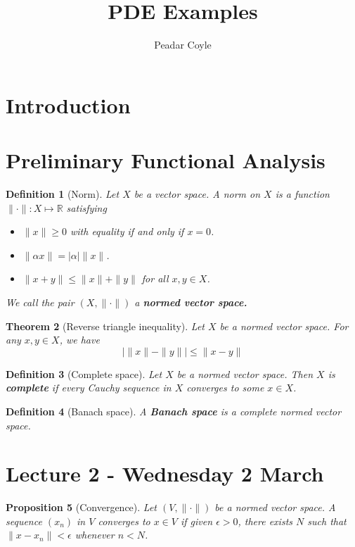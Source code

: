 \documentclass[12pt, oneside, a4paper]{article}
\title{PDE Examples}
\author{Peadar Coyle}
\newtheorem{thm}{Theorem}[section]
\newtheorem{prop}[thm]{Proposition}
\theoremstyle{dfn}
\newtheorem{dfn}[thm]{Definition}
\newcommand{\R}{\mathbb{R}}
\begin{document}
\maketitle
\tableofcontents
\section{Introduction}
\section{Preliminary Functional Analysis}

\begin{dfn}[Norm]
    Let $X$ be a vector space.  A norm on $X$ is a function $\| \cdot \| : X \mapsto \R$ satisfying 
    \begin{itemize}
        \item $\| x \| \geq 0$ with equality if and only if $x = 0$.  
        \item $\| \alpha x \| = | \alpha | \| x \|$.
        \item $\| x + y \| \leq \| x \| + \| y \|$ for all $x, y \in X$.  
    \end{itemize}
    
    We call the pair $(X, \| \cdot \|)$ a \textbf{normed vector space.}
\end{dfn}

\begin{thm}[Reverse triangle inequality]
    Let $X$ be a normed vector space.  For any $x, y \in X$, we have \[
        \left| \|x \| - \| y \| \right| \leq \| x - y \|  
    \]
\end{thm}

\begin{dfn}[Complete space]
    Let $X$ be a normed vector space.  Then $X$ is \textbf{complete} if every Cauchy sequence in $X$ converges to some $x \in X$.  
\end{dfn}

\begin{dfn}[Banach space]
    A \textbf{Banach space} is a complete normed vector space.
\end{dfn}



\section{Lecture 2 - Wednesday 2 March} %
\label{sec:lecture_2_2_march}

\begin{prop}[Convergence] Let $(V, \| \cdot \| )$ be a normed vector space.  A sequence $(x_n)$ in $V$ converges to $x \in V$ if given $\epsilon > 0$, there exists $N$ such that $\| x - x_n \| < \epsilon$ whenever $n < N$. 
\end{prop}
\end{document}
